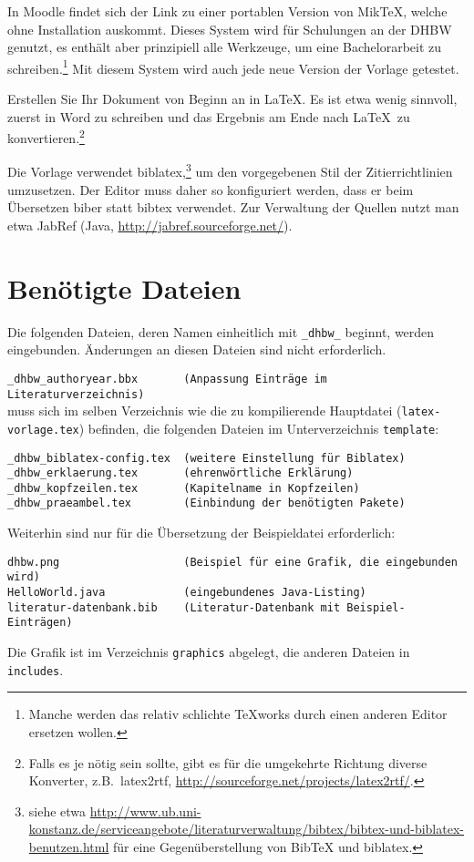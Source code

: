 In Moodle findet sich der Link zu einer portablen Version von MikTeX, welche ohne Installation auskommt. Dieses System wird für Schulungen an der DHBW genutzt, es enthält aber prinzipiell alle Werkzeuge, um eine Bachelorarbeit zu schreiben.\footnote{Manche werden das relativ schlichte TeXworks durch einen anderen Editor ersetzen wollen.} Mit diesem System wird auch jede neue Version der Vorlage getestet.

Erstellen Sie Ihr Dokument von Beginn an in \LaTeX. Es ist etwa wenig sinnvoll, zuerst in Word zu schreiben und das Ergebnis am Ende nach \LaTeX\ zu konvertieren.\footnote{Falls es je nötig sein sollte, gibt es für die umgekehrte Richtung diverse Konverter, z.B.\ latex2rtf, \url{http://sourceforge.net/projects/latex2rtf/}.} 

   
Die Vorlage verwendet biblatex,\footnote{siehe etwa \url{http://www.ub.uni-konstanz.de/serviceangebote/literaturverwaltung/bibtex/bibtex-und-biblatex-benutzen.html} für eine Gegenüberstellung von BibTeX und biblatex.}
um den vorgegebenen Stil der Zitierrichtlinien umzusetzen. Der Editor muss daher so konfiguriert werden, dass er beim Übersetzen biber statt bibtex verwendet. Zur Verwaltung der Quellen nutzt man etwa JabRef (Java, \url{http://jabref.sourceforge.net/}).

\section{Benötigte Dateien}

Die folgenden Dateien, deren Namen einheitlich mit \verb|_dhbw_| beginnt, werden eingebunden. Änderungen an diesen Dateien sind nicht erforderlich.

\verb|_dhbw_authoryear.bbx       (Anpassung Einträge im Literaturverzeichnis)| \\
muss sich im selben Verzeichnis wie die zu kompilierende Hauptdatei (\verb|latex-vorlage.tex|) befinden, die folgenden Dateien im Unterverzeichnis \verb|template|:
\begin{verbatim}
_dhbw_biblatex-config.tex  (weitere Einstellung für Biblatex)
_dhbw_erklaerung.tex       (ehrenwörtliche Erklärung)
_dhbw_kopfzeilen.tex       (Kapitelname in Kopfzeilen) 
_dhbw_praeambel.tex        (Einbindung der benötigten Pakete)
\end{verbatim}

Weiterhin sind nur für die Übersetzung der Beispieldatei erforderlich:
\begin{verbatim}
dhbw.png                   (Beispiel für eine Grafik, die eingebunden wird)
HelloWorld.java            (eingebundenes Java-Listing)
literatur-datenbank.bib    (Literatur-Datenbank mit Beispiel-Einträgen)
\end{verbatim}
Die Grafik ist im Verzeichnis \verb|graphics| abgelegt, die anderen Dateien in \verb|includes|. 


